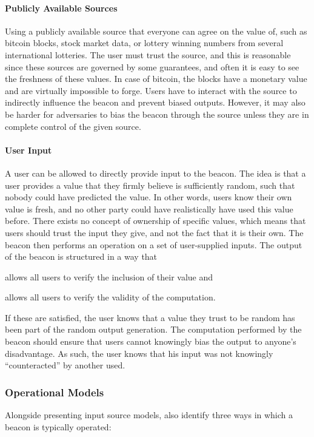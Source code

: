 \paragraph{Publicly Available Sources}
Using a publicly available source that everyone can agree on the value of, such as bitcoin blocks, stock market data, or lottery winning numbers from several international lotteries.
The user must trust the source, and this is reasonable since these sources are governed by some guarantees, and often it is easy to see the freshness of these values.
In case of bitcoin, the blocks have a monetary value and are virtually impossible to forge.
Users have to interact with the source to indirectly influence the beacon and prevent biased outputs.
However, it may also be harder for adversaries to bias the beacon through the source unless they are in complete control of the given source.

\paragraph{User Input}
A user can be allowed to directly provide input to the beacon.
The idea is that a user provides a value that they firmly believe is sufficiently random, such that nobody could have predicted the value. In other words, users know their own value is fresh, and no other party could have realistically have used this value before.
There exists no concept of ownership of specific values, which means that users should trust the input they give, and not the fact that it is their own.
The beacon then performs an operation on a set of user-supplied inputs.
The output of the beacon is structured in a way that
\begin{eletterate*}
    \item allows all users to verify the inclusion of their value and
    \item allows all users to verify the validity of the computation.
\end{eletterate*}

If these are satisfied, the user knows that a value they trust to be random has been part of the random output generation.
The computation performed by the beacon should ensure that users cannot knowingly bias the output to anyone's disadvantage.
As such, the user knows that his input was not knowingly \enquote{counteracted} by another used.

\subsubsection{Operational Models}
Alongside presenting input source models, \citet{worldsbestpaper} also identify three ways in which a beacon is typically operated:

